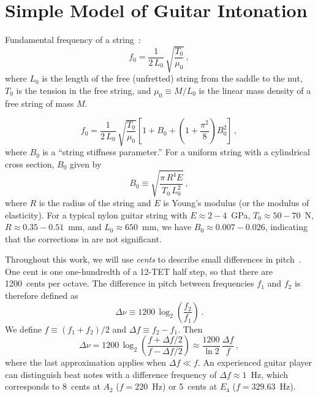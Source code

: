%
%
%

 \section{Simple Model of Guitar Intonation\label{sct:model}}

Fundamental frequency of a string~\cite{ref:morse1981vas,ref:morse1981vsa}:
 \begin{equation} \label{eqn:f_0_def}
f_0 = \frac{1}{2\, L_0}\, \sqrt{\frac{T_0}{\mu_0}}\, ,
 \end{equation}
where $L_0$ is the length of the free (unfretted) string from the saddle to the nut, $T_0$ is the tension in the free string, and $\mu_0 \equiv M / L_0$ is the linear mass density of a free string of mass $M$.

 \begin{equation} \label{eqn:f_0_stiff}
f_0 = \frac{1}{2\, L_0}\, \sqrt{\frac{T_0}{\mu_0}} \left[ 1 + B_0 + \left(1 + \frac{\pi^2}{8}\right) B_0^2 \right]\, ,
 \end{equation}
where $B_0$ is a ``string stiffness parameter.'' For a uniform string with a cylindrical cross section, $B_0$ given by~\cite{ref:morse1981vsb}
 \begin{equation} \label{eqn:b_def}
B_0 \equiv \sqrt{\frac{\pi\, R^4 E}{T_0\, L_0^2}}\, ,
 \end{equation}
where $R$ is the radius of the string and $E$ is Young's modulus (or the modulus of elasticity). For a typical nylon guitar string with $E \approx 2 - 4$~GPa, $T_0 \approx 50 - 70$~N, $R \approx 0.35 - 0.51$~mm, and $L_0 \approx 650$~mm, we have $B_0 \approx 0.007 - 0.026$, indicating that the corrections in  are not significant.

Throughout this work, we will use \emph{cents} to describe small differences in pitch~\cite{ref:durfee2015pms}. One cent is one one-hundredth of a 12-TET half step, so that there are 1200~cents per octave. The difference in pitch between frequencies $f_1$ and $f_2$ is therefore defined as
 \begin{equation} \label{eqn:cents_def}
\Delta \nu \equiv 1200\, \log_2\left(\frac{f_2}{f_1}\right)\, .
 \end{equation}
We define $f \equiv (f_1 + f_2) / 2$ and $\Delta f \equiv f_2 - f_1$. Then
 \begin{equation} \label{eqn:cents_approx}
\Delta \nu = 1200\, \log_2\left(\frac{f + \Delta f / 2}{f - \Delta f /2}\right) \approx \frac{1200}{\ln 2}\, \frac{\Delta f}{f}\, ,
 \end{equation}
where the last approximation applies when $\Delta f \ll f$. An experienced guitar player can distinguish beat notes with a difference frequency of $\Delta f \approx 1$~Hz, which corresponds to 8~cents at $A_2$ ($f = 220$~Hz) or 5~cents at $E_4$ ($f = 329.63$~Hz).

